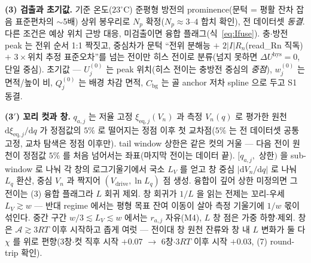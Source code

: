\documentclass[11pt,a4paper]{article}
\newcommand{\dd}{\mathrm{d}}
\newcommand{\eq}{\mathrm{eq}}
\newcommand{\drive}{\mathrm{drive}}
\newcommand{\bg}{\mathrm{bg}}
\newcommand{\hys}{\mathrm{hys}}
\begin{document}
\textbf{(3) 검출과 초기값.} 기준 온도($23^\circ$C) 준평형 방전의 prominence(문턱 = 평활 잔차 잡음 표준편차의 $\sim$5배) 상위 봉우리로 $N_p$ 확정($N_p\approx3$--$4$ 합치 확인), 전 데이터셋 \emph{동결}. 다른 조건은 예상 위치 근방 대응, 미검출이면 융합 플래그(식~\eqref{eq:Ifuse}). 충$\cdot$방전 peak 는 전위 순서 1:1 짝짓고, 중심차가 문턱 ``전위 분해능 $+$ $2|I|R_n$(read\_Rn 직독) $+$ $3\times$위치 추정 표준오차''를 넘는 전이만 히스 전이로 분류(넘지 못하면 $\Delta U^\hys=0$, 단일 중심). 초기값 — $U_j^{(0)}$ 는 peak 위치(히스 전이는 충방전 중심의 \emph{중점}), $w_j^{(0)}$ 는 면적/높이 비, $Q_j^{(0)}$ 는 배경 차감 면적, $C_\bg$ 는 골 anchor 저차 spline 으로 두고 S1 동결.

\textbf{(3$'$) 꼬리 컷과 창.} $q_{a,j}$ 는 저율 고정 $\xi_{\eq,j}(V_n)$ 과 측정 $V_n(q)$ 로 평가한 원천 $\dd\xi_{\eq,j}/\dd q$ 가 정점값의 $5\%$ 로 떨어지는 정점 이후 첫 교차점($5\%$ 는 전 데이터셋 공통 고정, 교차 탐색은 정점 이후만). tail window 상한은 같은 컷의 거울 — 다음 전이 원천이 정점값 $5\%$ 를 처음 넘어서는 좌표(마지막 전이는 데이터 끝). $[q_{a,j},$ 상한$)$ 을 sub-window 로 나눠 각 창의 로그기울기에서 국소 $L_V$ 를 얻고 창 중심 $|\dd V_n/\dd q|$ 로 나눠 $L_q$ 환산, 중심 $V_n$ 과 짝지어 $(V_\drive,\ln L_q)$ 점 생성. 융합이 깊어 상한 미정의면 그 전이는 (3) 융합 플래그라 $L$ 회귀 제외. 창 회귀가 $1/L$ 을 읽는 전제는 꼬리-우세 $L_V\gtrsim w$ — 반대 regime 에서는 평형 목표 잔여 이동이 살아 측정 기울기에 $1/w$ 몫이 섞인다. 중간 구간 $w/3\lesssim L_V\lesssim w$ 에서는 $r_{a,j}$ 자유(M4), $L$ 창 점은 가중 하향$\cdot$제외. 창은 $\mathcal A\gtrsim3RT$ 이후 시작하고 좁게 여럿 — 전이대 창 원천 잔류와 창 내 $L$ 변화가 둘 다 $\chi$ 를 위로 편향(3창$\cdot$컷 직후 시작 $+0.07$ $\to$ 6창$\cdot$$3RT$ 이후 시작 $+0.03$, (7) round-trip 확인).
\end{document}
